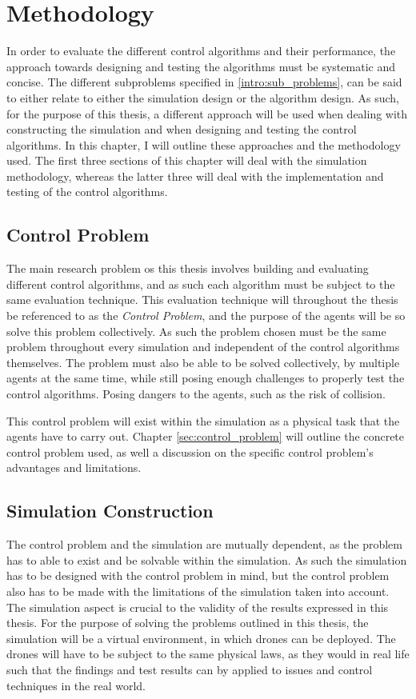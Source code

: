 
\chapter{Methodology}
In order to evaluate the different control algorithms and their performance, the approach towards designing and testing the algorithms must be systematic and concise. 
The different subproblems specified in \ref{intro:sub_problems}, can be said to either relate to either the simulation design or the algorithm design. As such, for the purpose of this thesis, a different approach will be used when dealing with constructing the simulation and when designing and testing the control algorithms. In this chapter, I will outline these approaches and the methodology used. The first three sections of this chapter will deal with the simulation methodology, whereas the latter three will deal with the implementation and testing of the control algorithms. 

\section{Control Problem}
The main research problem os this thesis involves building and evaluating different control algorithms, and as such each algorithm must be subject to the same evaluation technique.
This evaluation technique will throughout the thesis be referenced to as the \textit{Control Problem}, and the purpose of the agents will be so solve this problem collectively. 
As such the problem chosen must be the same problem throughout every simulation and independent of the control algorithms themselves. The problem must also be able to be solved collectively, by multiple agents at the same time, while still posing enough challenges to properly test the control algorithms. Posing dangers to the agents, such as the risk of collision. 

This control problem will exist within the simulation as a physical task that the agents have to carry out. Chapter \ref{sec:control_problem} will outline the concrete control problem used, as well a discussion on the specific control problem's advantages and limitations. 

\section{Simulation Construction}
The control problem and the simulation are mutually dependent, as the problem has to able to exist and be solvable within the simulation. As such the simulation has to be designed with the control problem in mind, but the control problem also has to be made with the limitations of the simulation taken into account. The simulation aspect is crucial to the validity of the results expressed in this thesis. For the purpose of solving the problems outlined in this thesis, the simulation will be a virtual environment, in which drones can be deployed. The drones will have to be subject to the same physical laws, as they would in real life such that the findings and test results can by applied to issues and control techniques in the real world.

